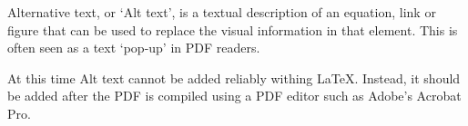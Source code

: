 Alternative text, or `Alt text', is a textual description of an equation, link or figure that can be used to replace the visual information in that element. This is often seen as a text `pop-up' in PDF readers. 

At this time Alt text cannot be added reliably withing LaTeX. Instead, it should be added after the PDF is compiled using a PDF editor such as Adobe's Acrobat Pro. 
